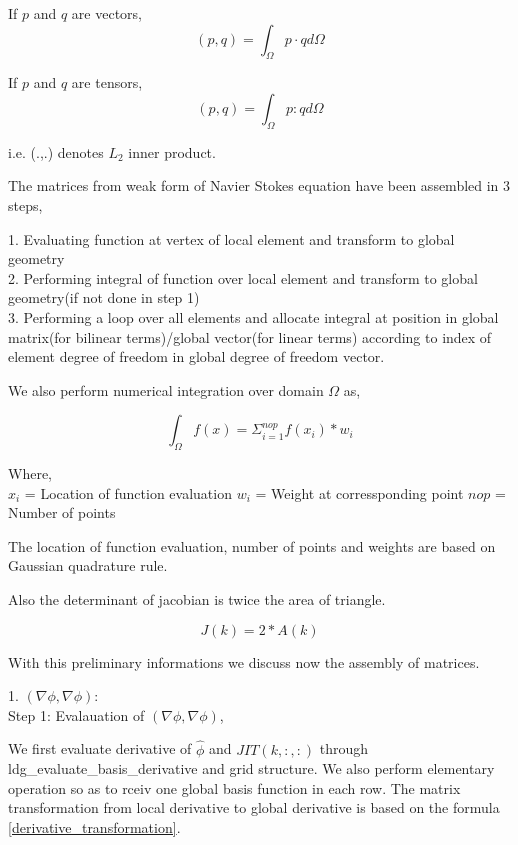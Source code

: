 \documentclass[a4paper,12pt]{book}
\begin{document}
If $p$ and $q$ are vectors,
\begin{equation}\label{Inner product vectors}
(p,q)=\int_{\Omega} p \cdot q d\Omega
\end{equation}

If $p$ and $q$ are tensors,
\begin{equation}\label{Inner product tensors}
(p,q)=\int_{\Omega} p:q d\Omega
\end{equation}

i.e. (.,.) denotes $L_2$ inner product.

The matrices from weak form of Navier Stokes equation have been assembled in 3 steps,

1. Evaluating function at vertex of local element and transform to global geometry\\
2. Performing integral of function over local element and transform to global geometry(if not done in step 1)\\
3. Performing a loop over all elements and allocate integral at position in global matrix(for bilinear terms)/global vector(for linear terms) according to index of element degree of freedom in global degree of freedom vector.

We also perform numerical integration over domain $\Omega$ as,

\begin{equation}\label{numerical integration}
\int_{\Omega} f(x) = \Sigma_{i=1}^{nop} f(x_i) * w_i
\end{equation}

Where, \\

$x_i$ = Location of function evaluation
$w_i$ = Weight at corressponding point
$nop$ = Number of points

The location of function evaluation, number of points and weights are based on Gaussian quadrature rule.

Also the determinant of jacobian is twice the area of triangle.

\begin{equation}\label{determinant to area}
J(k) = 2*A(k)
\end{equation}

With this preliminary informations we discuss now the assembly of matrices.

1. $(\nabla \phi, \nabla \phi)$:\\

Step 1: Evalauation of $(\nabla \phi , \nabla \phi)$,

We first evaluate derivative of $\hat{\phi}$ and $JIT(k,:,:)$ through ldg\_evaluate\_basis\_derivative and grid structure. We also perform elementary operation so as to rceiv one global basis function in each row. The matrix transformation from local derivative to global derivative is based on the formula \ref{derivative_transformation}.
\end{document}
